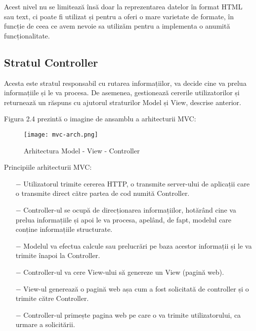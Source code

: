 Acest nivel nu se limitează însă doar la reprezentarea datelor în format HTML sau text, ci poate fi utilizat și pentru a oferi o mare varietate de formate, în funcție de ceea ce avem nevoie sa utilizăm pentru a implementa o anumită funcționalitate.

\subsection{Stratul Controller}
Acesta este stratul responsabil cu rutarea informațiilor, va decide cine va prelua informațiile și le va procesa. De asemenea, gestionează cererile utilizatorilor și returnează un răspuns cu ajutorul straturilor Model și View, descrise anterior.\newline

Figura 2.4 prezintă o imagine de ansamblu a arhitecturii MVC:\newline

\begin{figure}[H]
	\begin{center}
		\texttt{[image: mvc-arch.png]}
		\caption{Arhitectura Model - View - Controller}
	\end{center}
\end{figure}

Principiile arhitecturii MVC:

\begin{itemize}
	\addtolength{\itemindent}{1cm}
	\item[$-$]Utilizatorul trimite cererea HTTP, o transmite server-ului de aplicații care o transmite direct către partea de cod numită Controller.
	\item[$-$]Controller-ul se ocupă de direcționarea informațiilor, hotărând cine va prelua informațiile și apoi le va procesa, apelând, de fapt, modelul care conține informațiile structurate.
	\item[$-$]Modelul va efectua calcule sau prelucrări pe baza acestor informații și le va trimite înapoi la Controller.
	\item[$-$]Controller-ul va cere View-ului să genereze un View (pagină web).
	\item[$-$]View-ul generează o pagină web așa cum a fost solicitată de controller și o trimite către Controller.
	\item[$-$]Controller-ul primește pagina web pe care o va trimite utilizatorului, ca urmare a solicitării.
	\newline
\end{itemize}


